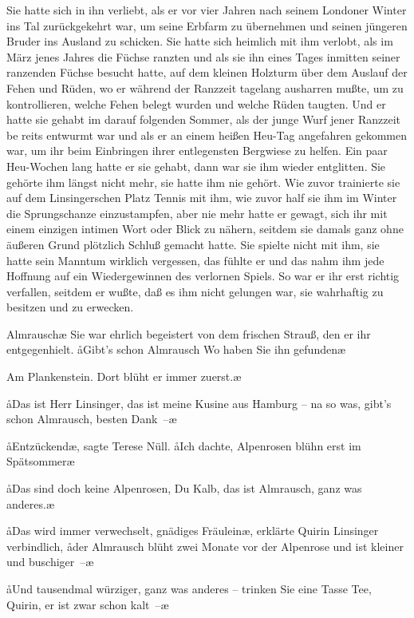 Sie hatte sich in ihn verliebt, als er vor vier Jahren nach
seinem Londoner Winter ins Tal zurückgekehrt war, um seine
Erbfarm zu übernehmen und seinen jüngeren Bruder ins
Ausland zu schicken. Sie hatte sich heimlich mit ihm verlobt,
als im März jenes Jahres die Füchse ranzten und als sie ihn
eines Tages inmitten seiner ranzenden Füchse besucht hatte,
auf dem kleinen Holzturm über dem Auslauf der Fehen und
Rüden, wo er während der Ranzzeit tagelang ausharren
mußte, um zu kontrollieren, welche Fehen belegt wurden
und welche Rüden taugten. Und er hatte sie gehabt im darauf\-%
folgenden Sommer, als der junge Wurf jener Ranzzeit be\-%
reits entwurmt war und als er an einem heißen Heu-Tag
angefahren gekommen war, um ihr beim Einbringen ihrer
entlegensten Bergwiese zu helfen. Ein paar Heu-Wochen
lang hatte er sie gehabt, dann war sie ihm wieder entglitten.
Sie gehörte ihm längst nicht mehr, sie hatte ihm nie gehört.
Wie zuvor trainierte sie auf dem Linsingerschen Platz Tennis
mit ihm, wie zuvor half sie ihm im Winter die Sprungschanze
einzustampfen, aber nie mehr hatte er gewagt, sich ihr mit
einem einzigen intimen Wort oder Blick zu nähern, seitdem
sie damals ganz ohne äußeren Grund plötzlich Schluß gemacht
hatte. Sie spielte nicht mit ihm, sie hatte sein Manntum
wirklich vergessen, das fühlte er und das nahm ihm jede
Hoffnung auf ein Wiedergewinnen des verlornen Spiels. So
war er ihr erst richtig verfallen, seitdem er wußte, daß es
ihm nicht gelungen war, sie wahrhaftig zu besitzen und zu
erwecken.

\aanah{}Almrausch\ausr{}\ae{} Sie war ehrlich begeistert von dem frischen
Strauß, den er ihr entgegenhielt. \aa{}Gibt's schon Almrausch\frag{}
Wo haben Sie ihn gefunden\frag{}\ae{}

\aanah{}Am Plankenstein. Dort blüht er immer zuerst.\ae{}

\aa{}Das ist Herr Linsinger, das ist meine Kusine aus Hamburg --
na so was, gibt's schon Almrausch, besten Dank~--\ae{}

\aa{}Entzückend\ae{}, sagte Terese Nüll. \aa{}Ich dachte, Alpenrosen
blühn erst im Spätsommer\frag{}\ae{}

\aa{}Das sind doch keine Alpenrosen, Du Kalb, das ist Almrausch,
ganz was anderes.\ae{}

\aa{}Das wird immer verwechselt, gnädiges Fräulein\ae{}, erklärte
Quirin Linsinger verbindlich, \aa{}der Almrausch blüht zwei
Monate vor der Alpenrose und ist kleiner und buschiger~--\ae{}

\aa{}Und tausendmal würziger, ganz was anderes -- trinken Sie
eine Tasse Tee, Quirin, er ist zwar schon kalt~--\ae{}

